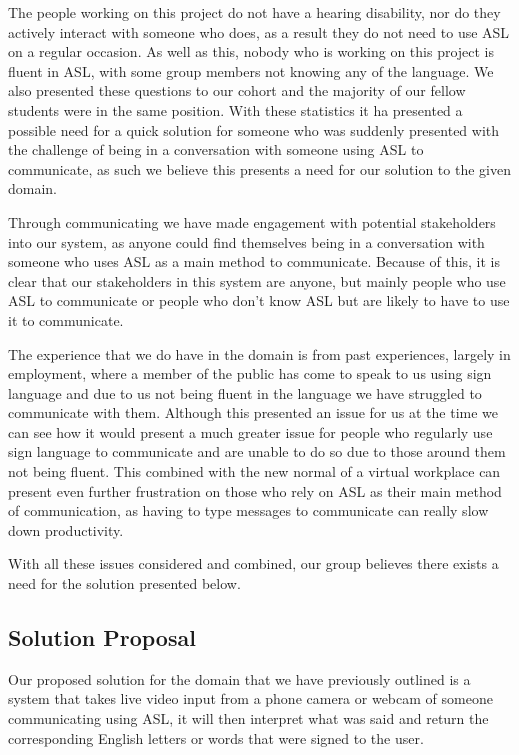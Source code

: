\documentclass[10pt]{article}
\begin{document}
The people working on this project do not have a hearing disability, nor do they actively interact 
with someone who does, as a result they do not need to use ASL on a regular occasion. As well as 
this, nobody who is working on this project is fluent in ASL, with some group members not knowing 
any of the language. We also presented these questions to our cohort and the majority of our fellow 
students were in the same position. With these statistics it ha presented a possible need for a 
quick solution for someone who was suddenly presented with the challenge of being in a conversation 
with someone using ASL to communicate, as such we believe this presents a need for our solution to 
the given domain.

Through communicating we have made engagement with potential stakeholders into our system, as anyone 
could find themselves being in a conversation with someone who uses ASL as a main method to 
communicate. Because of this, it is clear that our stakeholders in this system are anyone, but 
mainly people who use ASL to communicate or people who don't know ASL but are likely to have to use 
it to communicate.

The experience that we do have in the domain is from past experiences, largely in employment, where 
a member of the public has come to speak to us using sign language and due to us not being fluent in 
the language we have struggled to communicate with them. Although this presented an issue for us at 
the time we can see how it would present a much greater issue for people who regularly use sign 
language to communicate and are unable to do so due to those around them not being fluent. This 
combined with the new normal of a virtual workplace can present even further frustration on those 
who rely on ASL as their main method of communication, as having to type messages to communicate can 
really slow down productivity.

With all these issues considered and combined, our group believes there exists a need for the 
solution presented below.

\subsection{Solution Proposal}

Our proposed solution for the domain that we have previously outlined is a system that takes live 
video input from a phone camera or webcam of someone communicating using ASL, it will then interpret 
what was said and return the corresponding English letters or words that were signed to the user.
\end{document}
